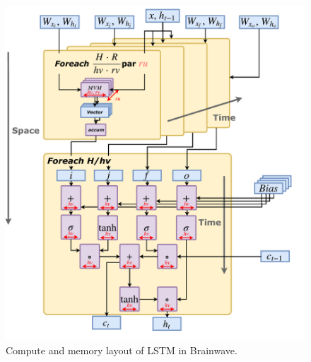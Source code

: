\label{sec:blaslstm}
 \begin{figure}
  \centering
  \includegraphics[width=0.8\columnwidth]{figs/bwlstm.pdf}
  \caption{Compute and memory layout of LSTM in Brainwave.}\label{fig:bw_lstm}
   \vspace*{-0.3in}
\end{figure}

